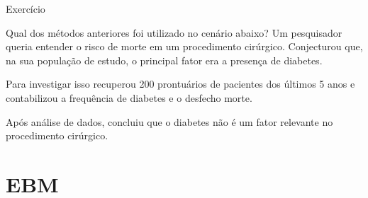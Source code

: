\documentclass{beamer}
\begin{document}





\begin{frame}{Exercício}
  \begin{block}{Qual dos métodos anteriores foi utilizado no cenário abaixo?}
    Um pesquisador queria entender o risco de morte em um procedimento cirúrgico.
Conjecturou que, na sua população de estudo, o principal fator era a presença de diabetes.

Para investigar isso recuperou 200 prontuários de pacientes dos últimos 5 anos e contabilizou a frequência de diabetes e o desfecho morte.

Após análise de dados, concluiu que o diabetes não é um fator relevante no procedimento cirúrgico.
  \end{block}
\end{frame}

\section{EBM}
\end{document}
